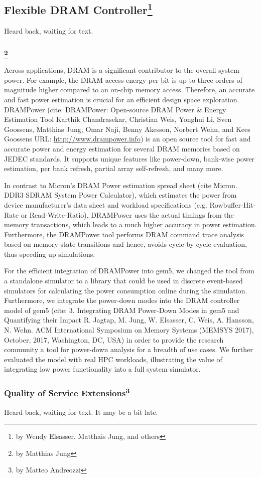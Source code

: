 \subsection[Flexible DRAM Controller]{Flexible DRAM Controller\footnote{by Wendy Elsasser, Matthais Jung, and others}}

Heard back, waiting for text.

\subsubsection[DRAMPower and DRAM Power-Down Modes]{\footnote{by Matthias Jung}}

Across applications, DRAM is a significant contributor to the overall system power.
For example, the DRAM access energy per bit is up to three orders of magnitude higher compared to an on-chip memory access.
Therefore, an accurate and fast power estimation is crucial for an efficient design space exploration.
DRAMPower (cite: DRAMPower: Open-source DRAM Power \& Energy Estimation Tool Karthik Chandrasekar, Christian Weis, Yonghui Li, Sven Goossens, Matthias Jung, Omar Naji, Benny Akesson, Norbert Wehn, and Kees Goossens URL: \url{http://www.drampower.info}) is an open source tool for fast and accurate power and energy estimation for several DRAM memories based on JEDEC standards.
It supports unique features like power-down, bank-wise power estimation, per bank refresh, partial array self-refresh, and many more.

In contrast to Micron’s DRAM Power estimation spread sheet (cite Micron. DDR3 SDRAM System Power Calculator), which estimates the power from device manufacturer’s data sheet and workload specifications (e.g. Rowbuffer-Hit-Rate or Read-Write-Ratio), DRAMPower uses the actual timings from the memory transactions, which leads to a much higher accuracy in power estimation.
Furthermore, the DRAMPower tool performs DRAM command trace analysis based on memory state transitions and hence, avoids cycle-by-cycle evaluation, thus speeding up simulations.

For the efficient integration of DRAMPower into gem5, we changed the tool from a standalone simulator to a library that could be used in discrete event-based simulators for calculating the power consumption online during the simulation.
Furthermore, we integrate the power-down modes into the DRAM controller model of gem5 (cite: 3.	Integrating DRAM Power-Down Modes in gem5 and Quantifying their Impact R. Jagtap, M. Jung, W. Elsasser, C. Weis, A. Hansson, N. Wehn. ACM International Symposium on Memory Systems (MEMSYS 2017), October, 2017, Washington, DC, USA) in order to provide the research community a tool for power-down analysis for a breadth of use cases. We further evaluated the model with real HPC workloads, illustrating the value of integrating low power functionality into a full system simulator.

\subsubsection[Quality of Service Extensions]{Quality of Service Extensions\footnote{by Matteo Andreozzi}}

Heard back, waiting for text.
It may be a bit late.
